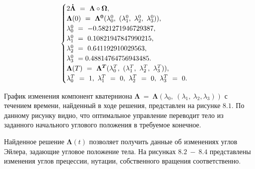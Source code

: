 \documentclass[14pt]{extreport}
\begin{document}
\begin{equation}
\begin{cases}
2\boldsymbol{\dot{\Lambda}}\ =\ \boldsymbol{\Lambda} \circ \boldsymbol\Omega,\\
 \boldsymbol\Lambda(0)\ =\ \boldsymbol{\Lambda^{0}}(\lambda_0^{0},\ (\lambda_1^{0},\ \lambda_2^{0},\ \lambda_3^{0})), \\
 \lambda_{0}^{0}\ =\ -0.5821271946729387, \\
 \lambda_{1}^{0}\ =\ 0.10821947847990215, \\
 \lambda_{2}^{0}\ =\ 0.641192910029563, \\
 \lambda_{3}^{0}\ =\-0.48814764756943485. \\
 \boldsymbol\Lambda(T)\ =\ \boldsymbol{\Lambda^{T}}(\lambda_0^{T},\ (\lambda_1^{T},\ \lambda_2^{T},\ \lambda_3^{T})), \\
 \lambda_{0}^{T}\ =\ 1, \ 
 \lambda_{1}^{T}\ =\ 0, \ 
 \lambda_{2}^{T}\ =\ 0, \ 
 \lambda_{3}^{T}\ =\ 0. \ 
 \end{cases}
\end{equation}

График изменения компонент кватерниона $\boldsymbol\Lambda\ =\ \boldsymbol\Lambda(\lambda_0,\ (\lambda_1,\ \lambda_2, \lambda_3))$ с течением времени,
найденный в ходе решения, представлен на рисунке $8.1$. По данному рисунку видно, что оптимальное управление переводит тело из заданного начального
углового положения в требуемое конечное.

Найденное решение $\boldsymbol\Lambda(t)$ позволяет получить данные об изменениях углов Эйлера, задающие угловое положение тела.
На рисунках $8.2\ -\ 8.4$ представлены изменения углов прецессии, нутации, собственного вращения соответственно.
\end{document}
